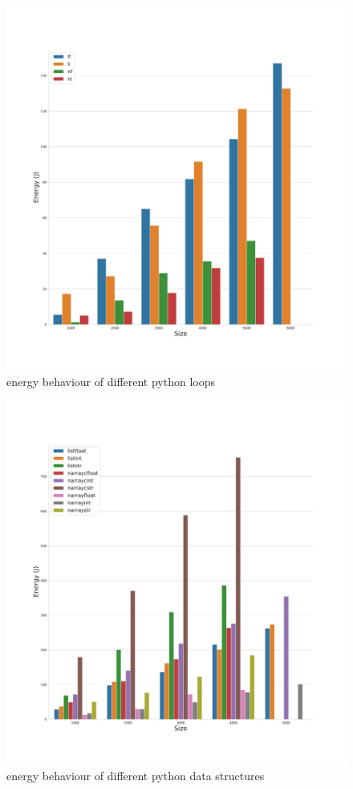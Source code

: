 \begin{figure}
    \centering
    \includegraphics[width=\linewidth]{imgs/pythonloops}
    \caption{energy behaviour of different python loops }
    \label{fig:pythonloops}
\end{figure}

\begin{figure}
    \centering
    \includegraphics[width=\linewidth]{imgs/pythonarrays}
    \caption{energy behaviour of different python data structures}
    \label{fig:pythonarrays}
\end{figure}


